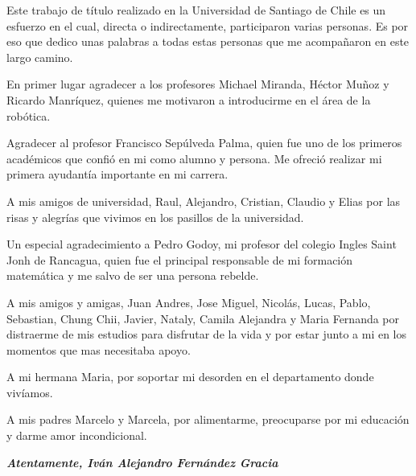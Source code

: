\thispagestyle{fancy}

\vspace{5mm}

Este trabajo de título realizado en la Universidad de Santiago de Chile es un esfuerzo en el cual, directa o indirectamente, participaron varias personas. Es por eso que dedico unas palabras a todas estas personas que me acompañaron en este largo camino.

En primer lugar agradecer a los profesores Michael Miranda, Héctor Muñoz y Ricardo Manríquez, quienes me motivaron a introducirme en el área de la robótica.  

Agradecer  al profesor Francisco Sepúlveda Palma, quien fue uno de los primeros académicos que confió en mi como alumno y persona. Me ofreció realizar mi primera ayudantía importante en mi carrera.

A mis amigos de universidad, Raul, Alejandro, Cristian, Claudio y  Elias por las risas y alegrías que vivimos en los pasillos de la universidad.

Un especial agradecimiento a Pedro Godoy, mi profesor del colegio Ingles Saint Jonh de Rancagua, quien fue el principal responsable de mi formación matemática y me salvo de ser una persona rebelde.

A mis amigos y amigas, Juan Andres, Jose Miguel, Nicolás, Lucas, Pablo, Sebastian, Chung Chii, Javier, Nataly, Camila Alejandra y Maria Fernanda por distraerme de mis estudios para disfrutar de la vida y por estar junto a mi en los momentos que mas necesitaba apoyo.     

A mi hermana Maria, por soportar mi desorden en el departamento donde vivíamos. 

A mis padres Marcelo y Marcela, por alimentarme, preocuparse por mi educación y darme amor incondicional.


\begin{flushright}
{
{\sc \textbf{\textit{Atentamente, Iván Alejandro Fernández Gracia}}} \\
}
\end{flushright}



